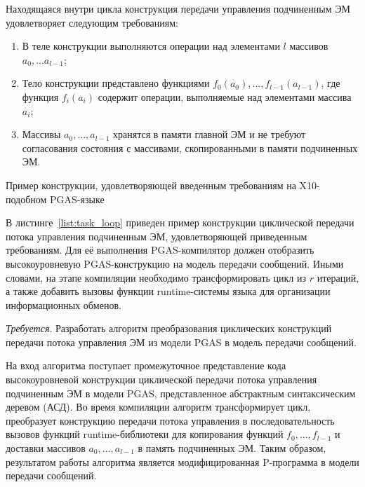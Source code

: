 Находящаяся внутри цикла конструкция передачи управления подчиненным ЭМ удовлетворяет следующим требованиям:
\begin{enumerate}
\item В теле конструкции выполняются операции над элементами $l$ массивов $a_{0},...a_{l-1}$;
\item Тело конструкции представлено функциями $f_{0}(a_{0}), ..., f_{l-1}(a_{l-1})$, где функция $f_{i}(a_{i})$ содержит операции, выполняемые над элементами массива $a_{i}$;
\item Массивы $a_{0}, ..., a_{l-1}$ хранятся в памяти главной ЭМ и не требуют согласования состояния с массивами, скопированными в памяти подчиненных ЭМ.
\end{enumerate}

\begin{ListingEnv}[!h]
	
    \caption{Пример конструкции, удовлетворяющей введенным требованиям на X10-подобном PGAS-языке}
    \label{list:task_loop}
\end{ListingEnv}

В листинге~\ref{list:task_loop} приведен пример конструкции циклической передачи потока управления подчиненным ЭМ, удовлетворяющей приведенным требованиям. Для её выполнения PGAS-компилятор должен отобразить высокоуровневую PGAS-конструкцию на модель передачи сообщений. Иными словами, на этапе компиляции необходимо трансформировать цикл из $r$ итераций, а также добавить вызовы функции runtime-системы языка для организации информационных обменов.

\textit{Требуется}. Разработать алгоритм преобразования циклических конструкций передачи потока управления ЭМ из модели PGAS в модель передачи сообщений.

На вход алгоритма поступает промежуточное представление кода высокоуровневой конструкции циклической передачи потока управления подчиненным ЭМ в модели PGAS, представленное абстрактным синтаксическим деревом (АСД). Во время компиляции алгоритм трансформирует цикл, преобразует конструкцию передачи потока управления в последовательность вызовов функций runtime-библиотеки для копирования функций $f_{0},...,f_{l-1}$ и доставки массивов $a_{0},...,a_{l-1}$ в память подчиненных ЭМ. Таким образом, результатом работы алгоритма является модифицированная P-программа в модели передачи сообщений.


